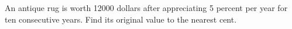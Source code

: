 An antique rug is worth 12000 dollars after appreciating 5 percent per year for ten consecutive years. Find its original value to the nearest cent.
